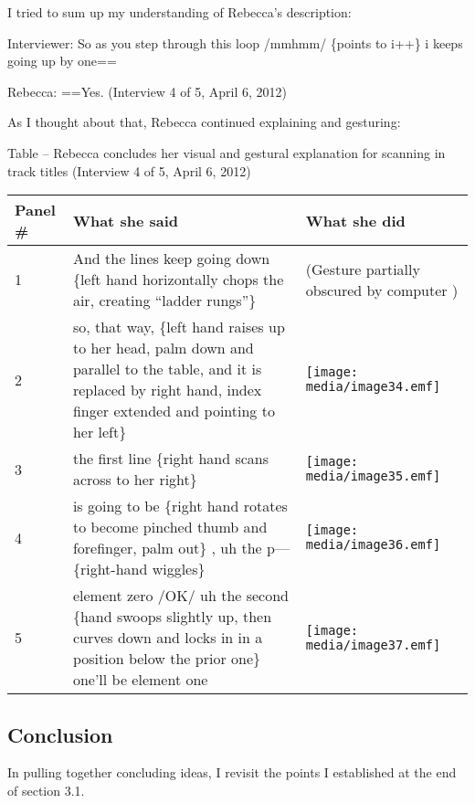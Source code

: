 I tried to sum up my understanding of Rebecca's description:

Interviewer: So as you step through this loop /mmhmm/ \{points to i++\}
i keeps going up by one==

Rebecca: ==Yes. (Interview 4 of 5, April 6, 2012)

As I thought about that, Rebecca continued explaining and gesturing:

\protect\hypertarget{ux5fToc252445965}{}{}Table -- Rebecca concludes her
visual and gestural explanation for scanning in track titles (Interview
4 of 5, April 6, 2012)

\begin{longtable}[]{@{}lll@{}}
\toprule
Panel \# & What she said & What she did\tabularnewline
\midrule
\endhead
1 & And the \textbar{}\textbar{}lines keep going
down\textbar{}\textbar{} \textbar{}\{left hand horizontally chops the
air, creating ``ladder rungs''\}\textbar{} & (Gesture partially obscured
by computer )\tabularnewline
2 & so, \textbar{}\textbar{}that way,\textbar{}\textbar{}
\textbar{}\{left hand raises up to her head, palm down and parallel to
the table, and it is replaced by right hand, index finger extended and
pointing to her left\}\textbar{} &
\texttt{[image: media/image34.emf]}\tabularnewline
3 & \textbar{}\textbar{}the first line\textbar{}\textbar{}
\textbar{}\{right hand scans across to her right\}\textbar{} &
\texttt{[image: media/image35.emf]}\tabularnewline
4 & is going to \textbar{}\textbar{}be\textbar{}\textbar{}
\textbar{}\{right hand rotates to become pinched thumb and forefinger,
palm out\}\textbar{} , \textbar{}\textbar{}uh the
p---\textbar{}\textbar{} \textbar{}\{right-hand wiggles\}\textbar{} &
\texttt{[image: media/image36.emf]}\tabularnewline
5 & element zero /OK/ uh \textbar{}\textbar{}the
second\textbar{}\textbar{} \textbar{}\{hand swoops slightly up, then
curves down and locks in in a position below the prior one\}\textbar{}
one'll be element one &
\texttt{[image: media/image37.emf]}\tabularnewline
\bottomrule
\end{longtable}

\subsection{Conclusion}\label{conclusion-1}

In pulling together concluding ideas, I revisit the points I established
at the end of section 3.1.

